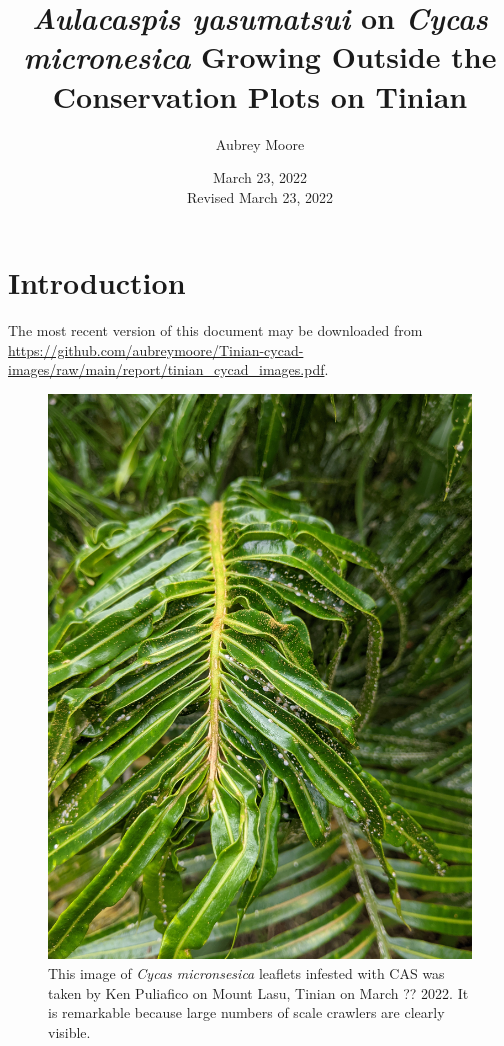 \documentclass[12pt,letterpaper,english,bibliography=totocnumbered, abstract=on]{scrartcl}
\begin{document}
\titlehead{Technical Report}

\title{\textit{Aulacaspis yasumatsui} on \textit{Cycas micronesica} Growing Outside the Conservation Plots on Tinian}

\author{Aubrey Moore}

\date{March 23, 2022\\Revised March 23, 2022}

\maketitle
\newpage
\tableofcontents

\pagebreak

\section{Introduction}

The most recent version of this document may be downloaded from \url{https://github.com/aubreymoore/Tinian-cycad-images/raw/main/report/tinian_cycad_images.pdf}.

\begin{figure}[h]
	\centering
	\includegraphics[width=1\linewidth]{../images/PXL_20210725_040405506}
	\caption{This image of \textit{Cycas micronsesica} leaflets infested with CAS was taken by Ken Puliafico on Mount Lasu, Tinian on March ?? 2022. It is remarkable because large numbers of scale crawlers are clearly visible.}
	\label{fig:crawlers}
\end{figure}
\end{document}
